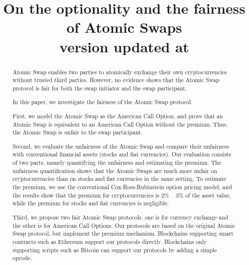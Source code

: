 \documentclass[sigconf, natbib=false]{acmart}
\renewcommand\_{\textunderscore\allowbreak}
\newcommand{\MOD}[1]{{\color{purple} #1}}
\begin{document}
\title{
    On the optionality and \MOD{the} fairness of Atomic Swaps \\
    {\normalsize \normalfont version updated at \DTMnow }
}

\begin{abstract}
Atomic Swap enables two parties to atomically exchange their own cryptocurrencies without trusted third parties.
However, no evidence shows that the Atomic Swap protocol is fair for both the swap initiator and the swap participant.

In this paper, we investigate the fairness of the Atomic Swap protocol.

First, we model the Atomic Swap as the American Call Option,
and prove that an Atomic Swap is equivalent to an American Call Option without the premium.
Thus, the Atomic Swap is unfair to the swap participant.

Second, we evaluate the unfairness of the Atomic Swap and compare their unfairness with conventional financial assets (stocks and fiat currencies).
Our evaluation consists of two parts, namely quantifying the unfairness and estimating the premium.
The unfairness quantification shows that the Atomic Swaps are much more unfair on cryptocurrencies than on stocks and fiat currencies in the same setting.
To estimate the premium, we use the conventional Cox-Ross-Rubinstein option pricing model, and the results show that the premium for cryptocurrencies is 2\% ~ 3\% of the asset value, while the premium for stocks and fiat currencies is negligible.

Third, we propose two fair Atomic Swap protocols,
one is for currency exchange and the other is for American Call Options.
Our protocols are based on the original Atomic Swap protocol, but implement the premium mechanism.
Blockchains supporting smart contracts such as Ethereum support our protocols directly.
Blockchains only supporting scripts such as Bitcoin can support our protocols by adding a simple opcode.
\end{abstract}
\end{document}
